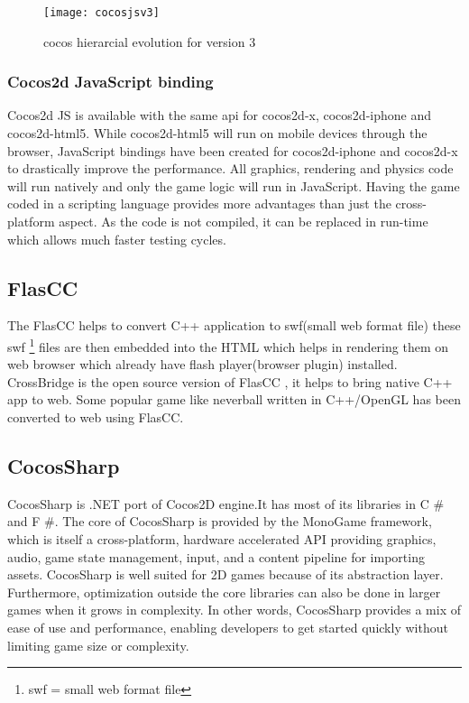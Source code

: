 \documentclass[23pt]{article}
\begin{document}
\begin{figure}[h]
\caption{cocos hierarcial evolution for version 3 \cite{architecture1}}
\centering
\texttt{[image: cocosjsv3]}
\end{figure}

\subsubsection{Cocos2d JavaScript binding }
{\Large Cocos2d JS is available with the same api for cocos2d-x, cocos2d-iphone and cocos2d-html5. While cocos2d-html5 will run on mobile devices through the browser, JavaScript bindings have been created for cocos2d-iphone and cocos2d-x to drastically improve the performance. All graphics, rendering and physics code will run natively and only the game logic will run in JavaScript.
Having the game coded in a scripting language provides more advantages than just the cross-platform aspect. As the code is not compiled, it can be replaced in run-time which allows much faster testing cycles.\cite{jsb}  \par}

\subsection{FlasCC }
{\Large The FlasCC helps to convert C++ application to swf(small web format file) these swf \footnote{swf = small web format file} files are then embedded into the HTML which helps in rendering them on web browser which already have flash player(browser plugin) installed. CrossBridge is the open source version of FlasCC , it helps to bring native C++ app to web. Some popular game like neverball written in C++/OpenGL has been converted to web using FlasCC. \cite{flascback} \par}

\newpage

\subsection{CocosSharp }
{\Large CocosSharp is .NET port of Cocos2D engine.It has most of its libraries in  C \# and F \#. The core of CocosSharp is provided by the MonoGame framework, which is itself a cross-platform, hardware accelerated API providing graphics, audio, game state management, input, and a content pipeline for importing assets. CocosSharp is well suited for 2D games because of its abstraction layer. Furthermore, optimization outside the core libraries can also be done in larger games when it grows in complexity. In other words, CocosSharp provides a mix of ease of use and performance, enabling developers to get started quickly without limiting game size or complexity. \cite{cocossharpback} \par}
\end{document}

